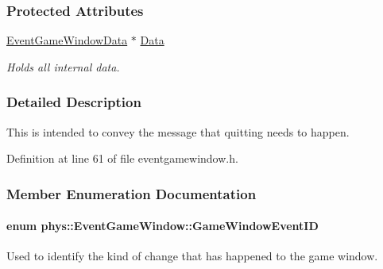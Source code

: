 \subsubsection*{Protected Attributes}
\begin{DoxyCompactItemize}
\item 
\hyperlink{classphys_1_1EventGameWindowData}{EventGameWindowData} $\ast$ \hyperlink{classphys_1_1EventGameWindow_aa5ceefae0b4ef7a017425cbd3ee08600}{Data}
\begin{DoxyCompactList}\small\item\em Holds all internal data. \item\end{DoxyCompactList}\end{DoxyCompactItemize}


\subsubsection{Detailed Description}
This is intended to convey the message that quitting needs to happen. 

Definition at line 61 of file eventgamewindow.h.



\subsubsection{Member Enumeration Documentation}
\hypertarget{classphys_1_1EventGameWindow_a45225255070513d3cff88cdfea25cc09}{
\paragraph[{GameWindowEventID}]{\setlength{\rightskip}{0pt plus 5cm}enum {\bf phys::EventGameWindow::GameWindowEventID}}\hfill}
\label{d4/d0f/classphys_1_1EventGameWindow_a45225255070513d3cff88cdfea25cc09}


Used to identify the kind of change that has happened to the game window. 

